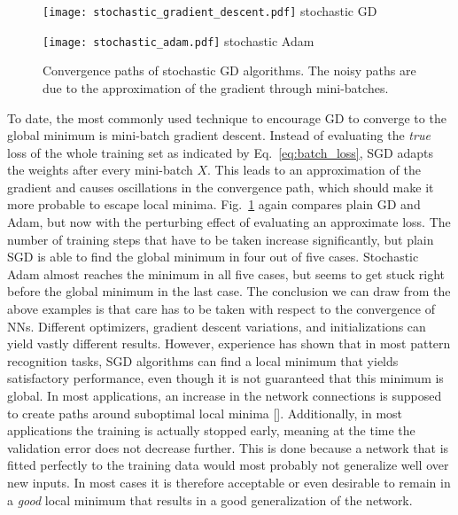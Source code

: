 \begin{figure}
  \begin{minipage}[b]{.49\textwidth}
    \centering
    \texttt{[image: stochastic\_gradient\_descent.pdf]}
    stochastic GD
  \end{minipage}
  \hspace{.02\textwidth}
  \begin{minipage}[b]{.49\textwidth}
    \centering
    \texttt{[image: stochastic\_adam.pdf]}
    stochastic Adam
  \end{minipage}
  \caption{Convergence paths of stochastic GD algorithms. The noisy paths are
    due to the approximation of the gradient through mini-batches.}
  \label{fig:error_surface_sgd}
\end{figure}
To date, the most commonly used technique to encourage GD to converge to the
global minimum is mini-batch gradient descent.  Instead of evaluating the
\emph{true} loss of the whole training set as indicated by
Eq.~\ref{eq:batch_loss}, SGD adapts the weights after every mini-batch $X$.
This leads to an approximation of the gradient and causes oscillations in the
convergence path, which should make it more probable to escape local minima.
Fig.~\ref{fig:error_surface_sgd} again compares plain GD and Adam, but now with
the perturbing effect of evaluating an approximate loss. The number of training
steps that have to be taken increase significantly, but plain SGD is able to
find the global minimum in four out of five cases. Stochastic Adam almost
reaches the minimum in all five cases, but seems to get stuck right before
the global minimum in the last case.  The conclusion we can draw from the above
examples is that care has to be taken with respect to the convergence of NNs.
Different optimizers, gradient descent variations, and initializations can
yield vastly different results. However, experience has shown that in most
pattern recognition tasks, SGD algorithms can find a local minimum that yields
satisfactory performance, even though it is not guaranteed that this minimum is
global.  In most applications, an increase in the network connections is
supposed to create paths around suboptimal local minima [\cite{rumelhart1986}].
Additionally, in most applications the training is actually stopped early,
meaning at the time the validation error does not decrease further.  This is
done because a network that is fitted perfectly to the training data would most
probably not generalize well over new inputs.  In most cases it is therefore
acceptable or even desirable to remain in a \emph{good} local minimum that
results in a good generalization of the network.


